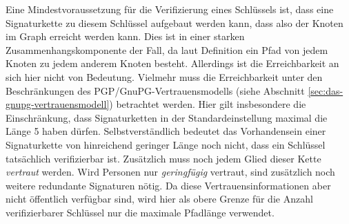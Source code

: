 Eine Mindestvoraussetzung f\"ur die Verifizierung eines Schl\"ussels
ist, dass eine Signaturkette zu diesem Schl\"ussel aufgebaut werden
kann, dass also der Knoten im Graph erreicht werden kann. Dies ist in
einer starken Zusammenhangskomponente der Fall, da laut Definition ein
Pfad von jedem Knoten zu jedem anderem Knoten besteht. Allerdings ist
die Erreichbarkeit an sich hier nicht von Bedeutung. Vielmehr muss die
Erreichbarkeit unter den Beschr\"ankungen des
PGP/GnuPG-Vertrauensmodells (siehe Abschnitt
\ref{sec:das-gnupg-vertrauensmodell}) betrachtet werden. Hier gilt
insbesondere die Einschr\"ankung, dass Signaturketten in der
Standardeinstellung maximal die L\"ange 5 haben
d\"urfen. Selbstverst\"andlich bedeutet das Vorhandensein einer
Signaturkette von hinreichend geringer L\"ange noch nicht, dass ein
Schl\"ussel tats\"achlich verifizierbar ist. Zus\"atzlich muss noch
jedem Glied dieser Kette \emph{vertraut} werden. Wird Personen nur
\emph{geringf\"ugig} vertraut, sind zus\"atzlich noch weitere
redundante Signaturen n\"otig. Da diese Vertrauensinformationen aber
nicht \"offentlich verf\"ugbar sind, wird hier als obere Grenze f\"ur
die Anzahl verifizierbarer Schl\"ussel nur die maximale Pfadl\"ange
verwendet.

